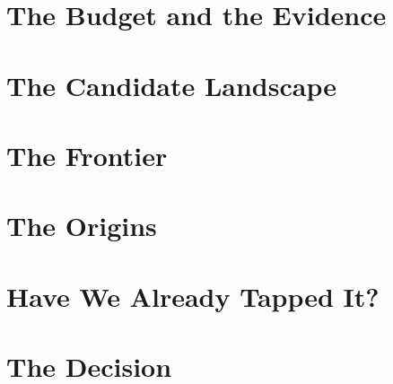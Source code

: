 
\part{The Budget and the Evidence}
\label{part:budget}





\part{The Candidate Landscape}
\label{part:candidates}







\part{The Frontier}
\label{part:frontier}







\part{The Origins}
\label{part:origins}




\part{Have We Already Tapped It?}
\label{part:tapped}






\part{The Decision}
\label{part:decision}




